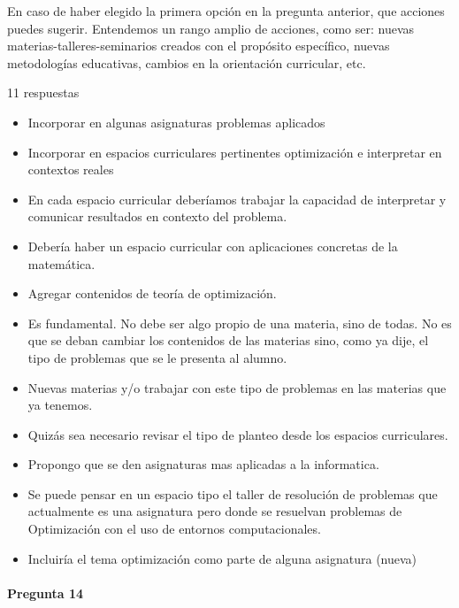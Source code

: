 \documentclass[a4paper,10pt,BCOR10mm,oneside,headsepline]{scrbook}
\begin{document}
\begin{subappendices}
 En caso de haber elegido la primera opción en la pregunta anterior, que acciones puedes sugerir. Entendemos un rango amplio de acciones, como ser: nuevas materias-talleres-seminarios creados con el propósito específico, nuevas metodologías educativas, cambios en la orientación curricular, etc.
 
 11 respuestas

 \begin{itemize}
  \item Incorporar en algunas asignaturas problemas aplicados 
 \item Incorporar en espacios curriculares pertinentes optimización e interpretar en contextos reales 

  \item En cada espacio curricular deberíamos trabajar la capacidad de interpretar y comunicar resultados en contexto del problema.
 \item Debería haber un espacio curricular con aplicaciones concretas de la matemática.
 \item Agregar contenidos de teoría de optimización. 
 \item Es fundamental. No debe ser algo propio de una materia, sino de todas. No es que se deban cambiar los contenidos de las materias sino, como ya dije, el tipo de problemas que se le presenta al alumno.

 \item Nuevas materias y/o trabajar con este tipo de problemas en las materias que ya tenemos.

  \item Quizás sea necesario revisar el tipo de planteo desde los espacios curriculares.

   \item Propongo que se den asignaturas mas aplicadas a la informatica.

    \item Se puede pensar en un espacio tipo el taller de resolución de problemas que actualmente es una asignatura pero donde se resuelvan problemas de Optimización con el uso de entornos computacionales. 
 \item  Incluiría  el tema  optimización como parte de alguna asignatura (nueva) 
 \end{itemize}

   \paragraph{Pregunta 14}
\begin{center}
 

\end{center}
\end{subappendices}
\end{document}
